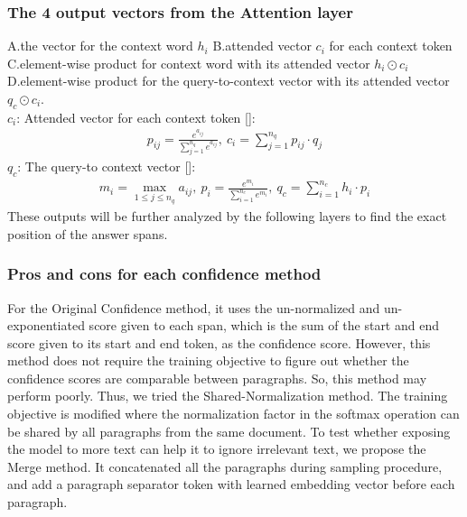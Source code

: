 \documentclass{article}
\begin{document}
\subsubsection{The 4 output vectors from the Attention layer}
A.the vector for the context word $h_i$ B.attended vector $c_i$ for each context token C.element-wise product for context word with its attended vector $h_i\odot c_i$ D.element-wise product for the query-to-context vector with its attended vector $q_c\odot c_i$. \\
$c_i$: Attended vector for each context token []: 
\begin{align*}
p_{ij} = \frac{e^{a_{ij}}}{{\sum_{j=1}^{n_q} e^{a_{ij}}}},\ c_{i} = \sum_{j=1}^{n_q} p_{ij}\cdot q_j
\end{align*}
$q_c$: The query-to context vector []: 
\begin{align*}
m_i = \max_{1 \leq j \leq n_q} a_{ij},\ p_i = \frac{e^{m_{i}}}{{\sum_{i=1}^{n_c} e^{m_{i}}}},\ q_c = \sum_{i=1}^{n_c} h_{i}\cdot p_i
\end{align*}
These outputs will be further analyzed by the following layers to find the exact position of the answer spans.

\subsubsection{Pros and cons for each confidence method}
For the Original Confidence method, it uses the un-normalized and un-exponentiated score given to each span, which is the sum of the start and end score given to its start and end token, as the confidence score. However, this method does not require the training objective to figure out whether the confidence scores are comparable between paragraphs. So, this method may perform poorly. Thus, we tried the Shared-Normalization method. The training objective is modified where the normalization factor in the softmax operation can be shared by all paragraphs from the same document.  To test whether exposing the model to more text can help it to ignore irrelevant text, we propose the Merge method. It concatenated all the paragraphs during sampling procedure, and add a paragraph separator token with learned embedding vector before each paragraph.
\end{document}
